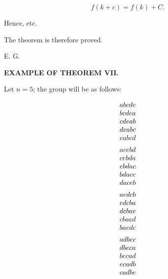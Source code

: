 \[
f(k+c)=f(k)+C.
\]

Hence, etc.

The theorem is therefore proved.

\medskip
\noindent\hfill \textsc{E. G.}\hspace{3em}


\begin{center}{\bfseries EXAMPLE OF THEOREM VII.}\end{center}

Let $n=5$; the group will be as follows:

\[
\GalControlReading{
\begin{array}{l}
  abcde \\
  bcdea \\
  cdeab \\
  deabc \\
  eabcd \\[1.2ex]
  acebd \\
  cebda \\
  ebdac \\
  bdace \\
  daceb \\[1.2ex]
  aedcb \\
  edcba \\
  dcbae \\
  cbaed \\
  baedc \\[1.2ex]
  adbec \\
  dbeca \\
  becad \\
  ecadb \\
  cadbe
\end{array}}{W09-CD006}
\]

\GalArticleEndRule

